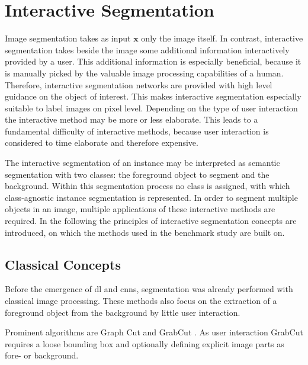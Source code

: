 
\section{Interactive Segmentation}\label{ord:ch2:sec3}

Image segmentation takes as input $\textbf{x}$ only the image itself.
In contrast, interactive segmentation takes beside the image some additional information interactively provided by a user.
This additional information is especially beneficial, because it is manually picked by the valuable image processing capabilities of a human.
Therefore, interactive segmentation networks are provided with high level guidance on the object of interest.
This makes interactive segmentation especially suitable to label images on pixel level.
Depending on the type of user interaction the interactive method may be more or less elaborate.
This leads to a fundamental difficulty of interactive methods, because user interaction is considered to time elaborate and therefore expensive.

The interactive segmentation of an instance may be interpreted as semantic segmentation with two classes: the foreground object to segment and the background.
Within this segmentation process no class is assigned, with which class-agnostic instance segmentation is represented.
In order to segment multiple objects in an image, multiple applications of these interactive methods are required.
In the following the principles of interactive segmentation concepts are introduced, on which the methods used in the benchmark study are built on.

\subsection{Classical Concepts}\label{ord:ch2:sec3:subsec1}
Before the emergence of \gls{dl} and \glspl{cnn}, segmentation was already performed with classical image processing.
These methods also focus on the extraction of a foreground object from the background by little user interaction.

Prominent algorithms are Graph Cut \cite{BJ01-GraphCut} and GrabCut \cite{RKB04-GrabCut}.
As user interaction GrabCut requires a loose bounding box and optionally defining explicit image parts as fore- or background.

